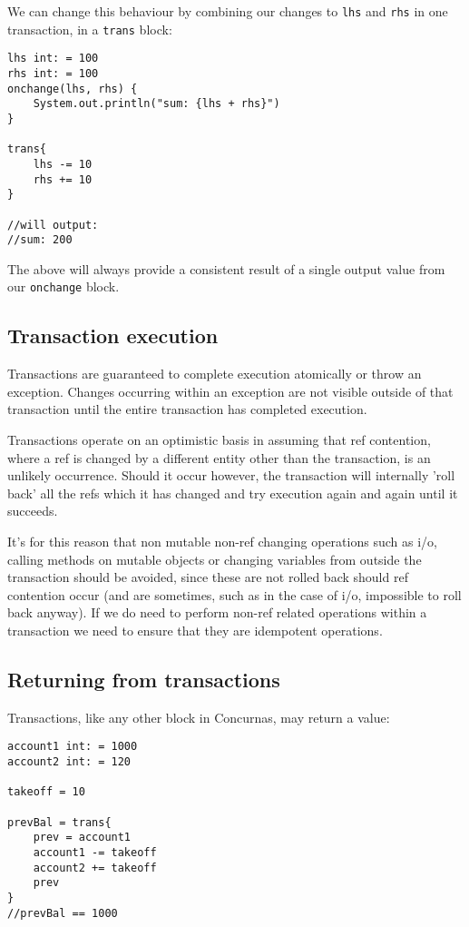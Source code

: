 \documentclass[conc-doc]{subfiles}
\begin{document}
We can change this behaviour by combining our changes to \lstinline{lhs} and \lstinline{rhs} in one transaction, in a \lstinline{trans} block:

\begin{lstlisting}
lhs int: = 100
rhs int: = 100
onchange(lhs, rhs) {
	System.out.println("sum: {lhs + rhs}")
}

trans{
	lhs -= 10
	rhs += 10
}

//will output:
//sum: 200
\end{lstlisting}

The above will always provide a consistent result of a single output value from our \lstinline{onchange} block.

\subsection{Transaction execution}
Transactions are guaranteed to complete execution atomically or throw an exception. Changes occurring within an exception are not visible outside of that transaction until the entire transaction has completed execution.

Transactions operate on an optimistic basis in assuming that ref contention, where a ref is changed by a different entity other than the transaction, is an unlikely occurrence. Should it occur however, the transaction will internally 'roll back' all the refs which it has changed and try execution again and again until it succeeds.

It's for this reason that non mutable non-ref changing operations such as i/o, calling methods on mutable objects or changing variables from outside the transaction should be avoided, since these are not rolled back should ref contention occur (and are sometimes, such as in the case of i/o, impossible to roll back anyway). If we do need to perform non-ref related operations within a transaction we need to ensure that they are idempotent operations.

\subsection{Returning from transactions}
Transactions, like any other block in Concurnas, may return a value:

\begin{lstlisting}
account1 int: = 1000
account2 int: = 120

takeoff = 10

prevBal = trans{
	prev = account1
	account1 -= takeoff
	account2 += takeoff
	prev
}
//prevBal == 1000
\end{lstlisting}
\end{document}
